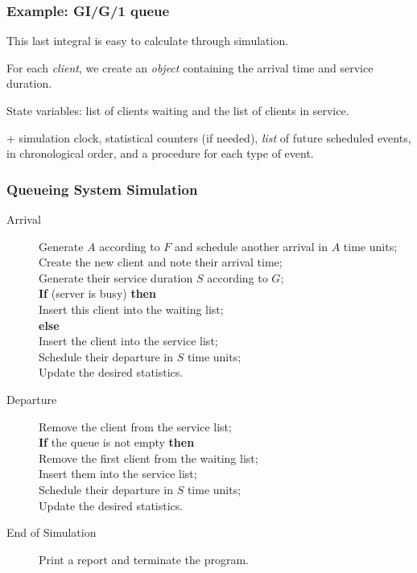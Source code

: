 \documentclass[t,usepdftitle=false,aspectratio=169]{beamer}
\begin{document}
\begin{frame}
	\frametitle{Example: GI/G/1 queue}
	
	This last integral is easy to calculate through simulation.
	
	\mbox{}
	
	For each \emph{client}, we create an \emph{object} containing the arrival time and service duration.
	
	\mbox{}
	
	State variables: list of clients waiting and the list of clients in service.
	
	\mbox{}
	
	+ simulation clock, statistical counters (if needed), \emph{list} of future scheduled events, in chronological order, and a procedure for each type of event.
	
\end{frame}

\begin{frame}
	\frametitle{Queueing System Simulation}
	
	\begin{footnotesize}
		\begin{description}
			\item[Arrival]
			Generate $A$ according to $F$ and schedule another arrival 
			in $A$ time units;\\
			Create the new client and note their arrival time;\\
			Generate their service duration $S$ according to $G$;\\
			{\bf If} (server is busy) {\bf then}\\
			\quad Insert this client into the waiting list;\\
			{\bf else}\\
			\quad Insert the client into the service list;\\
			\quad Schedule their departure in $S$ time units; \\
			Update the desired statistics.
			\item[Departure]
			Remove the client from the service list;\\
			{\bf If} the queue is not empty {\bf then}\\
			\quad Remove the first client from the waiting list;\\
			\quad Insert them into the service list;\\
			\quad Schedule their departure in 
			$S$ time units;\\
			Update the desired statistics.
			\item[End of Simulation]
			Print a report and terminate the program.
		\end{description}
	\end{footnotesize}
\end{frame}
\end{document}

